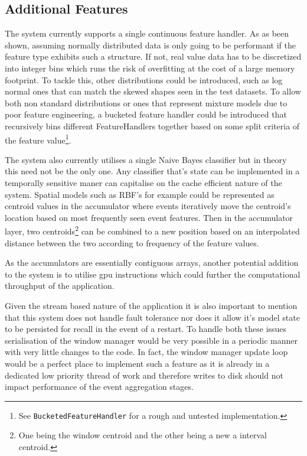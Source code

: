 \documentclass[a4paper,11pt]{scrreprt}
\begin{document}
\subsection{Additional Features}
The system currently supports a single continuous feature handler. As as been shown, assuming normally distributed data is only going to be performant if the feature type exhibits such a structure. If not, real value data has to be discretized into integer bins which runs the risk of overfitting at the cost of a large memory footprint. To tackle this, other distributions could be introduced, such as log normal ones that can match the skewed shapes seen in the test datasets. To allow both non standard distributions or ones that represent mixture models due to poor feature engineering, a bucketed feature handler could be introduced that recursively bins different FeatureHandlers together based on some split criteria of the feature value\footnote{See \verb|BucketedFeatureHandler| for a rough and untested implementation.}. \

The system also currently utilises a single Naive Bayes classifier but in theory this need not be the only one. Any classifier that's state can be implemented in a temporally sensitive maner can capitalise on the cache efficient nature of the system. Spatial models such as RBF's for example could be represented as centroid values in the accumulator where events iteratively move the centroid's location based on most frequently seen event features. Then in the accumulator layer, two centroids\footnote{One being the window centroid and the other being a new a interval centroid.} can be combined to a new position based on an interpolated distance between the two according to frequency of the feature values.\

As the accumulators are essentially contiguous arrays, another potential addition to the system is to utilise \acrshort{gpu} instructions which could further the computational throughput of the application.\

Given the stream based nature of the application it is also important to mention that this system does not handle fault tolerance nor does it allow it's model state to be persisted for recall in the event of a restart. To handle both these issues serialisation of the window manager would be very possible in a periodic manner with very little changes to the code. In fact, the window manager update loop would be a perfect place to implement such a feature as it is already in a dedicated low priority thread of work and therefore writes to disk should not impact performance of the event aggregation stages.
\end{document}
